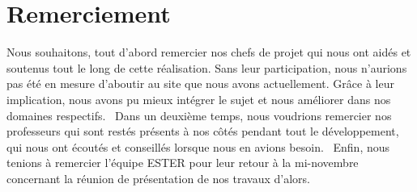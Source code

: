 \chapter*{Remerciement}

Nous souhaitons, tout d'abord remercier nos chefs de projet qui nous ont aidés et soutenus tout le long de cette réalisation. Sans leur participation, nous n'aurions pas été en mesure d'aboutir au site que nous avons actuellement. Grâce à leur implication, nous avons pu mieux intégrer le sujet et nous améliorer dans nos domaines respectifs. \
Dans un deuxième temps, nous voudrions remercier nos professeurs qui sont restés présents à nos côtés pendant tout le développement, qui nous ont écoutés et conseillés lorsque nous en avions besoin. \
Enfin, nous tenions à remercier l'équipe ESTER pour leur retour à la mi-novembre concernant la réunion de présentation de nos travaux d'alors. 
